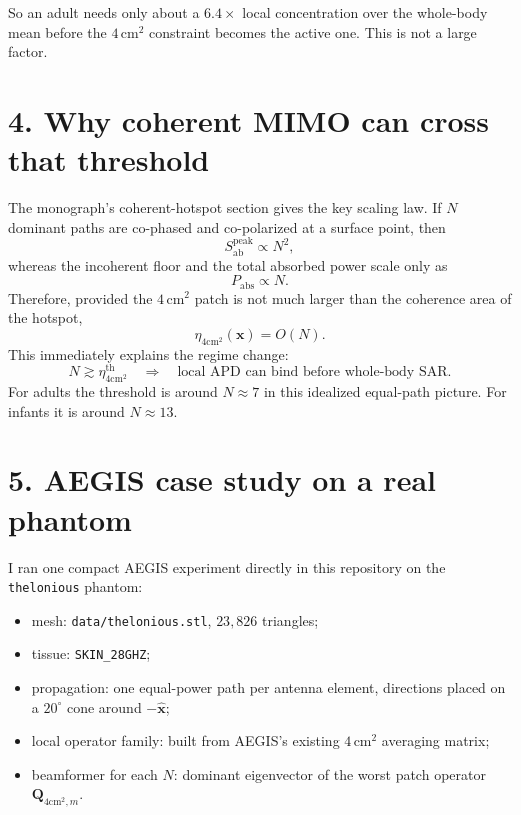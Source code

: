\documentclass[11pt]{article}
\newcommand{\x}{\mathbf{x}}
\newcommand{\Q}{\mathbf{Q}}
\newcommand{\Sab}{S_{\mathrm{ab}}}
\begin{document}
So an adult needs only about a $6.4\times$ local concentration over the
whole-body mean before the $4\,\mathrm{cm}^2$ constraint becomes the active
one. This is not a large factor.

\section*{4. Why coherent MIMO can cross that threshold}

The monograph's coherent-hotspot section gives the key scaling law. If $N$
dominant paths are co-phased and co-polarized at a surface point, then
\begin{equation}
  \Sab^{\mathrm{peak}} \propto N^2,
\end{equation}
whereas the incoherent floor and the total absorbed power scale only as
\begin{equation}
  P_{\mathrm{abs}} \propto N.
\end{equation}
Therefore, provided the $4\,\mathrm{cm}^2$ patch is not much larger than the
coherence area of the hotspot,
\begin{equation}
  \eta_{4\mathrm{cm}^2}(\x) = O(N).
\end{equation}
This immediately explains the regime change:
\begin{equation}
  N \gtrsim \eta_{4\mathrm{cm}^2}^{\mathrm{th}}
  \quad \Longrightarrow \quad
  \text{local APD can bind before whole-body SAR.}
\end{equation}
For adults the threshold is around $N \approx 7$ in this idealized equal-path
picture. For infants it is around $N \approx 13$.

\section*{5. AEGIS case study on a real phantom}

I ran one compact AEGIS experiment directly in this repository on the
\texttt{thelonious} phantom:
\begin{itemize}
  \item mesh: \texttt{data/thelonious.stl}, $23{,}826$ triangles;
  \item tissue: \texttt{SKIN\_28GHZ};
  \item propagation: one equal-power path per antenna element, directions placed
        on a $20^\circ$ cone around $-\hat{\mathbf{x}}$;
  \item local operator family: built from AEGIS's existing
        $4\,\mathrm{cm}^2$ averaging matrix;
  \item beamformer for each $N$: dominant eigenvector of the worst patch
        operator $\Q_{4\mathrm{cm}^2,m}$.
\end{itemize}
\end{document}
